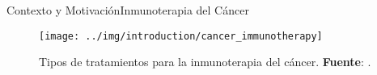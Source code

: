 \documentclass[10pt]{beamer}
\newcommand{\1}{
	\setbeamertemplate{background}{
		\texttt{[image: img/1]}
		\tikz[overlay] \fill[fill opacity=0.75,fill=white] (0,0) rectangle (-\paperwidth,\paperheight);
	}
}
\begin{document}
	












		


\begin{frame}{Contexto y Motivación}{Inmunoterapia del Cáncer}
	
	
	\begin{figure}[]
		\centering
		\texttt{[image: ../img/introduction/cancer\_immunotherapy]}
		\caption{Tipos de tratamientos para la inmunoterapia del cáncer. \textbf{Fuente}: \cite{kciuk2023recent}.}
	\end{figure}
\end{frame}
\end{document}
